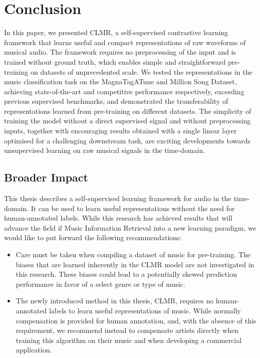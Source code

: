 \chapter{Conclusion}\label{sec:conclusion}
In this paper, we presented CLMR, a self-supervised contrastive learning framework that learns useful and compact representations of raw waveforms of musical audio.
The framework requires no preprocessing of the input and is trained without ground truth, which enables simple and straightforward pre-training on datasets of unprecedented scale.
We tested the representations in the music classification task on the MagnaTagATune and Million Song Dataset, achieving state-of-the-art and competitive performance respectively, exceeding previous supervised benchmarks, and demonstrated the transferability of representations learned from pre-training on different datasets.
The simplicity of training the model without a direct supervised signal and without preprocessing inputs, together with encouraging results obtained with a single linear layer optimised for a challenging downstream task, are exciting developments towards unsupervised learning on raw musical signals in the time-domain.

\section*{Broader Impact}
This thesis describes a self-supervised learning framework for audio in the time-domain.
It can be used to learn useful representations without the need for human-annotated labels.
While this research has achieved results that will advance the field if Music Information Retrieval into a new learning paradigm, we would like to put forward the following recommendations:

\begin{itemize}
    \item Care must be taken when compiling a dataset of music for pre-training. The biases that are learned inherently in the CLMR model are not investigated in this research. These biases could lead to a potentially skewed prediction performance in favor of a select genre or type of music.
    \item The newly introduced method in this thesis, CLMR, requires no human-annotated labels to learn useful representations of music. While normally compensation is provided for human annotation, and, with the absence of this requirement, we recommend instead to compensate artists directly when training this algorithm on their music and when developing a commercial application.
\end{itemize}